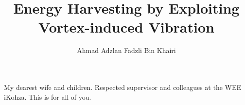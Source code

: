\documentclass[oneside]{utmthesis}
\begin{document}
\title{Energy Harvesting by Exploiting Vortex-induced Vibration}
\author{Ahmad Adzlan Fadzli Bin Khairi}

\coverpage
\superpage
\certification
\frontmatter
\maketitle
\declaration


\begin{dedication}
  My dearest wife and children. Respected supervisor and colleagues at the WEE iKohza. This is for all of you.\
\end{dedication}
\end{document}
